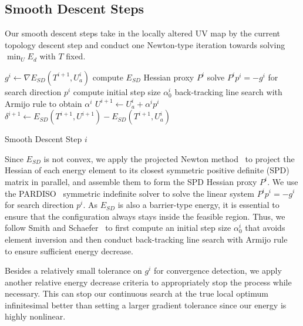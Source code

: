 
\subsection{Smooth Descent Steps}
\label{sec:descentStep}

Our smooth descent steps take in the locally altered UV map by the current topology descent step and conduct one Newton-type iteration towards solving $\min_U E_d$ with $T$ fixed.

\begin{algorithm}[h]
\SetAlgoLined
{}
$g^{i} \leftarrow \nabla E_{SD}(T^{i+1}, U_a^{i})$\;
compute $E_{SD}$ Hessian proxy $P^i$\;
solve $P^i p^i = -g^i$ for search direction $p^i$\;
compute initial step size $\alpha^i_0$\;
back-tracking line search with Armijo rule to obtain $\alpha^i$\;
$U^{i+1} \leftarrow U_a^i + \alpha^i p^i$\;
$\delta^{i+1} \leftarrow E_{SD}(T^{i+1}, U^{i+1}) - E_{SD}(T^{i+1}, U_a^{i})$\;
\caption{Smooth Descent Step $i$}
\label{alg:descentStep}
\end{algorithm}
Since $E_{SD}$ is not convex, we apply the projected Newton method~\cite{Teran2005Robust} to project the Hessian of each energy element to its closest symmetric positive definite (SPD) matrix in parallel, and assemble them to form the SPD Hessian proxy $P^i$. We use the PARDISO~\cite{pardiso-6.0a, pardiso-6.0b} symmetric indefinite solver to solve the linear system $P^i p^i = -g^i$ for search direction $p^i$.  As $E_{SD}$ is also a barrier-type energy, it is essential to ensure that the configuration always stays inside the feasible region. Thus, we follow Smith and Schaefer~ to first compute an initial step size $\alpha^i_0$ that avoids element inversion and then conduct back-tracking line search with Armijo rule~\cite{Armijo1966Minimization} to ensure sufficient energy decrease.

Besides a relatively small tolerance on $g^i$ for convergence detection, we apply another relative energy decrease criteria to appropriately stop the process while necessary.
This can stop our continuous search at the true local optimum infinitesimal better than setting a larger gradient tolerance since our energy is highly nonlinear. 

